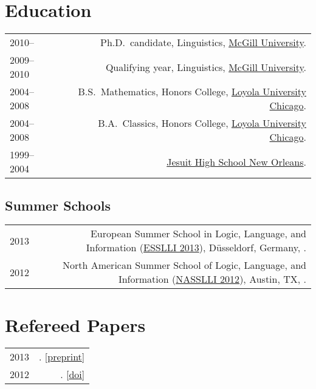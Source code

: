 \documentclass[letterpaper]{article}
\makeatletter
\newcommand{\formatdatenoday}[2]{\mydatenoday\formatdate{0}{#1}{#2}}
\newcommand{\myvrule}{\color{lightgray}\vrule width 1.0pt}
\newenvironment{cvsection}{%
  \renewcommand{\arraystretch}{1.75}
  \begin{longtable}[l]{@{} L R @{}}
}{%
  \end{longtable}
}
\makeatother
\begin{document}

\section*{Education}

\begin{cvsection}
  2010-- & Ph.D.~candidate, Linguistics, \href{http://www.mcgill.ca/}{McGill
  University}. \\

  2009--2010 & Qualifying year, Linguistics,
  \href{http://www.mcgill.ca/}{McGill University}. \\

  2004--2008 & B.S.~Mathematics, Honors College,
  \href{http://www.luc.edu/}{Loyola University Chicago}. \\

  2004--2008 & B.A.~Classics, Honors College, \href{http://www.luc.edu/}{Loyola
  University Chicago}. \\

  1999--2004 & \href{http://www.jesuitnola.org/about/aboutindex.htm}{Jesuit
  High School New Orleans}. \\
\end{cvsection}

\vspace{-1ex}
\subsection*{Summer Schools}

\begin{cvsection}
  2013 & European Summer School in Logic, Language, and Information
  (\href{http://esslli2013.de/}{ESSLLI 2013}), D\"{u}sseldorf, Germany,
  \formatdatenoday{8}{2013}. \\

  2012 & North American Summer School of Logic, Language, and Information
  (\href{http://nasslli2012.com/}{NASSLLI 2012}), Austin, TX,
  \formatdatenoday{6}{2012}. \\
\end{cvsection}



\section*{Refereed Papers}

\begin{cvsection}
  2013 & \null{}.
  [\href{http://people.linguistics.mcgill.ca/~brian.buccola/files/buccola2013-fg.pdf}{preprint}] \\

  2012 & \null{}.
  [\href{http://dx.doi.org/10.3765/sp}{doi}] \\
\end{cvsection}
\end{document}
